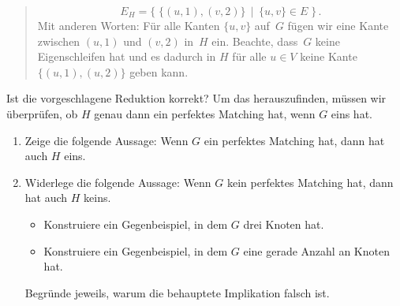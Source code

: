 \documentclass{uebung_cs}
\begin{document}
\begin{exercise}
\begin{quote}
		\[E_H = \Big\{\;\{(u,1),(v,2)\}\,\;\Big|\;\,\{u,v\} \in E\;\Big\}\,.\]
		Mit anderen Worten: Für alle Kanten $\{u,v\}$ auf~$G$ fügen wir eine Kante zwischen $(u,1)$ und $(v,2)$ in~$H$ ein. Beachte, dass~$G$ keine Eigenschleifen hat und es dadurch in $H$ für alle $u \in V$ keine Kante  $\{(u,1),(u,2)\}$ geben kann.
	\end{quote}
	Ist die vorgeschlagene Reduktion korrekt? Um das herauszufinden, müssen wir überprüfen, ob $H$ genau dann ein perfektes Matching hat, wenn $G$ eins hat.
	\begin{enumerate}[resume]
		\item\medium Zeige die folgende Aussage: Wenn $G$ ein perfektes Matching hat, dann hat auch $H$ eins.
		\item\medium Widerlege die folgende Aussage: Wenn $G$ kein perfektes Matching hat, dann hat auch $H$ keins.
		      \begin{itemize}
			      \item Konstruiere ein Gegenbeispiel, in dem $G$ drei Knoten hat. 
			      \item Konstruiere ein Gegenbeispiel, in dem $G$ eine gerade Anzahl an Knoten hat.
		      \end{itemize}
			  Begründe jeweils, warum die behauptete Implikation falsch ist.
	\end{enumerate}
\end{exercise}
\end{document}
